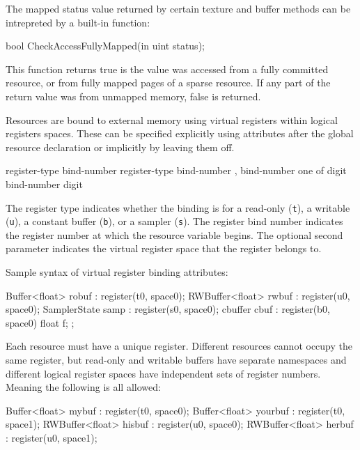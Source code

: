 


The mapped status value returned by certain texture and buffer methods can be intrepreted by a built-in function:

\begin{HLSL}
  bool CheckAccessFullyMapped(in uint status);
\end{HLSL}

This function returns true is the value was accessed from a fully committed resource,
or from fully mapped pages of a sparse resource.
If any part of the return value was from unmapped memory, false is returned.


Resources are bound to external memory using virtual registers within logical registers spaces.
These can be specified explicitly using attributes after the global resource declaration
or implicitly by leaving them off.

\begin{grammar}
  \br
   register-type bind-number \terminal{)}\br
   register-type bind-number ,  bind-number \terminal{)}\br
   \textnormal{one of}\br
  \br
  \br
  digit\br
  bind-number digit\br
\end{grammar}

The register type indicates whether the binding is for a read-only (\texttt{t}), a writable (\texttt{u}),
a constant buffer (\texttt{b}), or a sampler (\texttt{s}).
The register bind number indicates the register number at which the resource variable begins.
The optional second parameter indicates the virtual register space that the register belongs to.

Sample syntax of virtual register binding attributes:
\begin{HLSL}
  Buffer<float> robuf : register(t0, space0);
  RWBuffer<float> rwbuf : register(u0, space0);
  SamplerState samp : register(s0, space0);
  cbuffer cbuf : register(b0, space0) { float f; };
\end{HLSL}

Each resource must have a unique register. Different resources cannot occupy the same register,
but read-only and writable buffers have separate namespaces and different logical register spaces have independent
sets of register numbers. Meaning the following is all allowed:
\begin{HLSL}
  Buffer<float> mybuf : register(t0, space0);
  Buffer<float> yourbuf : register(t0, space1);
  RWBuffer<float> hisbuf : register(u0, space0);
  RWBuffer<float> herbuf : register(u0, space1);
\end{HLSL}


